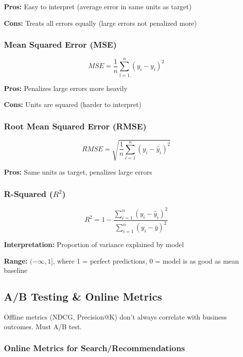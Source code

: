 \documentclass[11pt,letterpaper]{article}
\begin{document}
\textbf{Pros:} Easy to interpret (average error in same units as target)

\textbf{Cons:} Treats all errors equally (large errors not penalized more)

\subsubsection{Mean Squared Error (MSE)}

\begin{equation}
MSE = \frac{1}{n} \sum_{i=1}^{n} (y_i - \hat{y}_i)^2
\end{equation}

\textbf{Pros:} Penalizes large errors more heavily

\textbf{Cons:} Units are squared (harder to interpret)

\subsubsection{Root Mean Squared Error (RMSE)}

\begin{equation}
RMSE = \sqrt{\frac{1}{n} \sum_{i=1}^{n} (y_i - \hat{y}_i)^2}
\end{equation}

\textbf{Pros:} Same units as target, penalizes large errors

\subsubsection{R-Squared ($R^2$)}

\begin{equation}
R^2 = 1 - \frac{\sum_{i=1}^{n} (y_i - \hat{y}_i)^2}{\sum_{i=1}^{n} (y_i - \bar{y})^2}
\end{equation}

\textbf{Interpretation:} Proportion of variance explained by model

\textbf{Range:} $(-\infty, 1]$, where 1 = perfect predictions, 0 = model is as good as mean baseline

\subsection{A/B Testing \& Online Metrics}

Offline metrics (NDCG, Precision@K) don't always correlate with business outcomes. Must A/B test.

\subsubsection{Online Metrics for Search/Recommendations}
\end{document}
